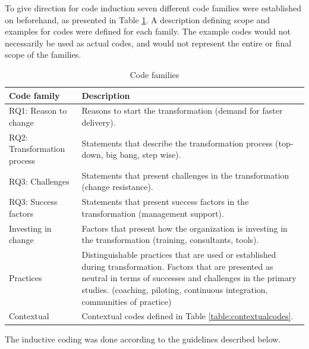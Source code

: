 To give direction for code induction seven different code families were
established on beforehand, as presented in Table \ref{table:codefamilies}. A
description defining scope and examples for codes were defined for each family.
The example codes would not necessarily be used as actual codes, and would not
represent the entire or final scope of the families.

\begin{table}[t]
    \centering
    \begin{tabular}{ >{\raggedright\arraybackslash}p{}
                     >{\raggedright\arraybackslash}p{} }
        \toprule
        Code family          &  Description
        \\
        \midrule

        RQ1: Reason to change &
        Reasons to start the transformation (demand for faster delivery). \\

		RQ2: Transformation process &
		Statements that describe the transformation process (top-down, big bang,
		step wise). \\

		RQ3: Challenges &
		Statements that present challenges in the transformation (change resistance).
		\\

		RQ3: Success factors &
		Statements that present success factors in the transformation (management
		support).
		\\

		Investing in change  &
		Factors that present how the organization is investing in the
		transformation (training, consultants, tools). \\

		Practices &
		Distinguishable practices that are used or established during transformation.
		Factors that are presented as neutral in terms of successes and challenges
		in the primary studies.
		(coaching, piloting, continuous integration, communities of practice) \\
		
		Contextual &
		Contextual codes defined in Table \ref{table:contextualcodes}. \\
		
        \bottomrule
    \end{tabular}
    \caption{Code families}
    \label{table:codefamilies}
\end{table}

The inductive coding was done according to the guidelines described below.

